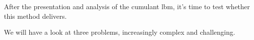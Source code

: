 After the presentation and analysis of the cumulant \gls{lbm}, it's time to test whether this method delivers.

We will have a look at three problems, increasingly complex and challenging. 
